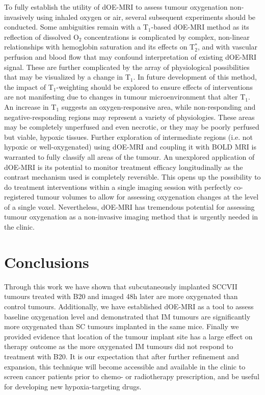 To fully establish the utility of \acs{dOE-MRI} to assess tumour oxygenation non-invasively using inhaled oxygen or air, several subsequent experiments should be conducted.
Some ambiguities remain with a T$_1$-based \acs{dOE-MRI} method as its reflection of dissolved O$_2$ concentrations is complicated by complex, non-linear relationships with hemoglobin saturation and its effects on T$_2^*$, and with vascular perfusion and blood flow that may confound interpretation of existing \acs{dOE-MRI} signal.
These are further complicated by the array of physiological possibilities that may be visualized by a change in T$_1$. 
In future development of this method, the impact of T$_1$-weighting should be explored to ensure effects of interventions are not manifesting due to changes in tumour microenvironment that alter T$_1$.
An increase in T$_1$ suggests an oxygen-responsive area, while non-responding and negative-responding regions may represent a variety of physiologies. 
These areas may be completely unperfused and even necrotic, or they may be poorly perfused but viable, hypoxic tissues.
Further exploration of intermediate regions (i.e. not hypoxic or well-oxygenated) using \acs{dOE-MRI} and coupling it with \acs{BOLD MRI} is warranted to fully classify all areas of the tumour. 
An unexplored application of \acs{dOE-MRI} is its potential to monitor treatment efficacy longitudinally as the contrast mechanism used is completely reversible. 
This opens up the possibility to do treatment interventions within a single imaging session with perfectly co-registered tumour volumes to allow for assessing oxygenation changes at the level of a single voxel.
Nevertheless, \acs{dOE-MRI} has tremendous potential for assessing tumour oxygenation as a non-invasive imaging method that is urgently needed in the clinic. 

\section{Conclusions}

Through this work we have shown that subcutaneously implanted SCCVII tumours treated with B20 and imaged 48h later are more oxygenated than control tumours. 
Additionally, we have established \acs{dOE-MRI} as a tool to assess baseline oxygenation level and demonstrated that \acs{IM} tumours are significantly more oxygenated than \acs{SC} tumours implanted in the same mice.
Finally we provided evidence that location of the tumour implant site has a large effect on therapy outcome as the more oxygenated \acs{IM} tumours did not respond to treatment with B20.
It is our expectation that after further refinement and expansion, this technique will become accessible and available in the clinic to screen cancer patients prior to chemo- or radiotherapy prescription, and be useful for developing new hypoxia-targeting drugs.




